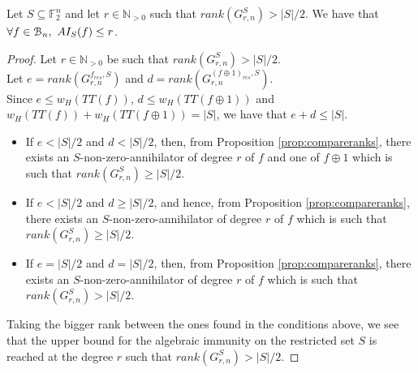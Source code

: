\documentclass[11pt]{llncs}
\begin{document}
\begin{theorem}
	Let $S\subseteq \mathbb{F}_2^n$ and let $r \in \mathbb{N}_{>0}$ such that $rank\left(G_{r, n}^{S}\right) > |S| / 2$.
	We have that $\forall f \in \mathcal{B}_{n}, \ AI_S(f) \leq r$.

\end{theorem}
\begin{proof}
	Let $r \in \mathbb{N}_{>0}$ be such that $rank\left(G_{r,n}^S\right) > |S| / 2$.\\
	Let $e = rank\left(G_{r,n}^{f_{res},S}\right)$ and $d = rank\left(G_{r,n}^{(f\oplus1)_{res},S}\right)$.\\
	Since $e \leq w_H\left(TT(f)\right)$, $d \leq w_H\left(TT(f\oplus 1)\right)$ and $w_H\left(TT(f)\right)+w_H\left(TT(f\oplus 1)\right) = |S|$, we have that $e+d\leq |S|$.\\ 
	\begin{itemize}
		\item If $e < |S|/2$ and $d < |S|/2$, then, from Proposition \ref{prop:compareranks}, there exists an $S$-non-zero-annihilator of degree $r$ of $f$ and one of $f\oplus 1$ which is such that $rank\left(G_{r,n}^S\right) \geq |S| / 2$.
		\item If $e < |S|/2$ and $d \geq |S|/2$, and hence, from Proposition \ref{prop:compareranks}, there exists an $S$-non-zero-annihilator of degree $r$ of $f$ which is such that $rank\left(G_{r,n}^S\right) \geq |S| / 2$.
		\item If $e = |S|/2$ and $d = |S|/2$, then, from Proposition \ref{prop:compareranks}, there exists an $S$-non-zero-annihilator of degree $r$ of $f$ which is such that $rank\left(G_{r,n}^S\right) > |S| / 2$.
	\end{itemize}
	Taking the bigger rank between the ones found in the conditions above, we see that the upper bound for the algebraic immunity on the restricted set $S$ is reached at the degree $r$ such that $rank\left(G_{r, n}^S\right) > |S| / 2$.
\end{proof}
 
\end{document}

